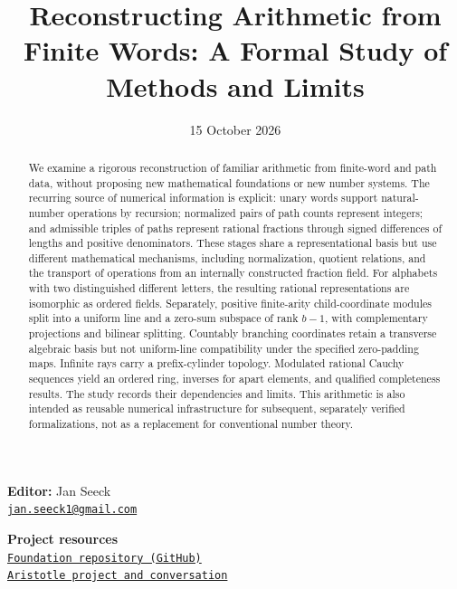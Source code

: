 \documentclass[11pt,reqno]{amsart}
\title[Reconstructing Arithmetic from Finite Words]{Reconstructing Arithmetic from Finite Words: A Formal Study of Methods and Limits}
\date{15 October 2026}
\theoremstyle{definition}\newtheorem{definition}[theorem]{Definition}
\theoremstyle{remark}\newtheorem{remark}[theorem]{Remark}
\begin{document}
\begin{abstract}
We examine a rigorous reconstruction of familiar arithmetic from finite-word and path data, without proposing new mathematical foundations or new number systems. The recurring source of numerical information is explicit: unary words support natural-number operations by recursion; normalized pairs of path counts represent integers; and admissible triples of paths represent rational fractions through signed differences of lengths and positive denominators. These stages share a representational basis but use different mathematical mechanisms, including normalization, quotient relations, and the transport of operations from an internally constructed fraction field. For alphabets with two distinguished different letters, the resulting rational representations are isomorphic as ordered fields. Separately, positive finite-arity child-coordinate modules split into a uniform line and a zero-sum subspace of rank $b-1$, with complementary projections and bilinear splitting. Countably branching coordinates retain a transverse algebraic basis but not uniform-line compatibility under the specified zero-padding maps. Infinite rays carry a prefix-cylinder topology. Modulated rational Cauchy sequences yield an ordered ring, inverses for apart elements, and qualified completeness results. The study records their dependencies and limits. This arithmetic is also intended as reusable numerical infrastructure for subsequent, separately verified formalizations, not as a replacement for conventional number theory.
\end{abstract}
\maketitle
\begin{center}
  \small\textbf{Editor:} Jan Seeck\\
  \href{mailto:jan.seeck1@gmail.com}{\texttt{jan.seeck1@gmail.com}}
\end{center}
\begin{center}
  \small
  \textbf{Project resources}\\[3pt]
  \href{https://github.com/antaris82/b-ary_tree/blob/main/Topics/Foundation/}{\texttt{Foundation repository (GitHub)}}\\[3pt]
  \href{https://aristotle.harmonic.fun/projects/db97653b-b468-41a1-97fd-7eb835c2087d}{\texttt{Aristotle project and conversation}}
\end{center}
\clearpage
\setcounter{tocdepth}{2}
\tableofcontents
\clearpage
\end{document}
